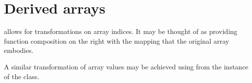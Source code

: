 \section{Derived arrays}
\begin{haddockdesc}
\item[\begin{tabular}{@{}l}
ixmap :: (Ix i, Ix j) => (i, i) -> (i -> j) -> Array j e -> Array i e
\end{tabular}]
{\haddockbegindoc
{} allows for transformations on array indices.
 It may be thought of as providing function composition on the right
 with the mapping that the original array embodies.\par
A similar transformation of array values may be achieved using 
 from the  instance of the  class.\par}
\end{haddockdesc}

